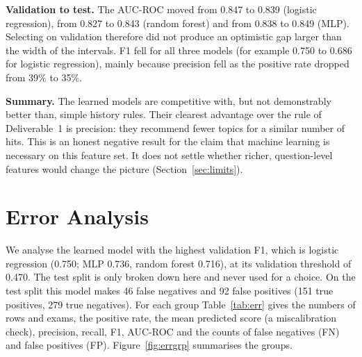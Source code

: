 \documentclass[11pt,a4paper]{article}
\newcommand{\auc}{AUC-ROC}
\begin{document}
\textbf{Validation to test.} The \auc{} moved from 0.847 to 0.839 (logistic regression), from 0.827 to 0.843 (random
forest) and from 0.838 to 0.849 (MLP). Selecting on validation therefore did not produce an optimistic gap larger than the
width of the intervals. F1 fell for all three models (for example 0.750 to 0.686 for logistic regression), mainly because
precision fell as the positive rate dropped from 39\% to 35\%.

\textbf{Summary.} The learned models are competitive with, but not demonstrably better than, simple history rules. Their
clearest advantage over the rule of Deliverable~1 is precision: they recommend fewer topics for a similar number of hits.
This is an honest negative result for the claim that machine learning is necessary on this feature set. It does not
settle whether richer, question-level features would change the picture (Section~\ref{sec:limits}).

\section{Error Analysis}
\label{sec:errors}

We analyse the learned model with the highest validation F1, which is logistic regression (0.750; MLP 0.736, random forest
0.716), at its validation threshold of 0.470. The test split is only broken down here and never used for a choice. On the
test split this model makes 46 false negatives and 92 false positives (151 true positives, 279 true negatives). For each
group Table~\ref{tab:err} gives the numbers of rows and exams, the positive rate, the mean predicted score (a
miscalibration check), precision, recall, F1, \auc{} and the counts of false negatives (FN) and false positives (FP).
Figure~\ref{fig:errgrp} summarises the groups.
\end{document}
